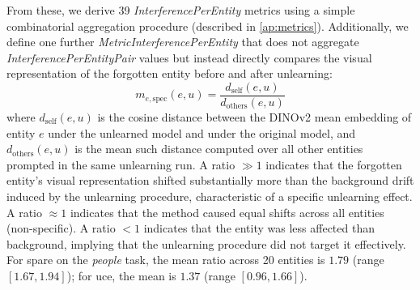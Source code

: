 %
%

From these, we derive 39 \textit{InterferencePerEntity} metrics using a simple
combinatorial aggregation procedure (described in \cref{ap:metrics}).
%
Additionally, we define one further \textit{MetricInterferencePerEntity} that does not
aggregate \textit{InterferencePerEntityPair} values but instead directly compares the
visual representation of the forgotten entity before and after unlearning:
%
$$m_{e,\text{spec}}(e, u) = \frac{d_\text{self}(e, u)}{d_\text{others}(e, u)}$$
%
where $d_\text{self}(e, u)$ is the cosine distance between the DINOv2 mean embedding of
entity $e$ under the unlearned model and under the original model,
and $d_\text{others}(e, u)$ is the mean such distance computed over all other entities
prompted in the same unlearning run.
A ratio $\gg 1$ indicates that the forgotten entity's visual representation shifted
substantially more than the background drift induced by the unlearning procedure,
characteristic of a specific unlearning effect.
A ratio $\approx 1$ indicates that the method caused equal shifts across all entities
(non-specific).
A ratio $< 1$ indicates that the entity was less affected than background, implying
that the unlearning procedure did not target it effectively.
%
For \ac{spare} on the \textit{people} task, the mean ratio across 20 entities is $1.79$
(range $[1.67, 1.94]$); for \ac{uce}, the mean is $1.37$ (range $[0.96, 1.66]$).
